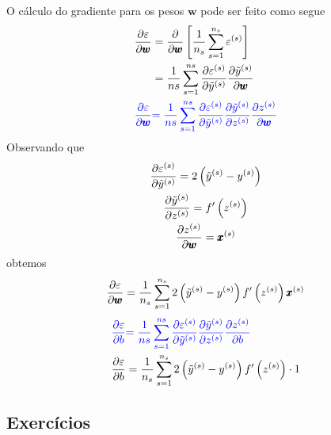 O cálculo do gradiente para os pesos $\pmb{w}$ pode ser feito como segue
\begin{align}
  \frac{\partial\varepsilon}{\partial \pmb{w}} &= \frac{\partial}{\partial\pmb{w}}\left[\frac{1}{n_s}\sum_{s=1}^{n_s}\varepsilon^{(s)}\right]\\
                                   &= \frac{1}{ns}\sum_{s=1}^{ns}\frac{\partial\varepsilon^{(s)}}{\partial\tilde{y}^{(s)}}\frac{\partial\tilde{y}^{(s)}}{\partial\pmb{w}}\\
  {\color{blue}\frac{\partial\varepsilon}{\partial \pmb{w}}} &{\color{blue}= \frac{1}{ns}\sum_{s=1}^{ns}\frac{\partial\varepsilon^{(s)}}{\partial\tilde{y}^{(s)}}\frac{\partial\tilde{y}^{(s)}}{\partial z^{(s)}}\frac{\partial z^{(s)}}{\partial\pmb{w}}}\\
\end{align}
Observando que
\begin{gather}
  \frac{\partial\varepsilon^{(s)}}{\partial\tilde{y}^{(s)}} = 2\left(\tilde{y}^{(s)} - y^{(s)}\right)\\
  \frac{\partial\tilde{y}^{(s)}}{\partial z^{(s)}} = f'\left(z^{(s)}\right)\\
  \frac{\partial z^{(s)}}{\partial\pmb{w}} = \pmb{x}^{(s)}
\end{gather}
obtemos
\begin{equation}
  \frac{\partial\varepsilon}{\partial \pmb{w}} = \frac{1}{n_s}\sum_{s=1}^{n_s}2\left(\tilde{y}^{(s)}-y^{(s)}\right)f'\left(z^{(s)}\right)\pmb{x}^{(s)}
\end{equation}
\begin{align}
  {\color{blue}\frac{\partial\varepsilon}{\partial b}} &{\color{blue}= \frac{1}{ns}\sum_{s=1}^{ns}\frac{\partial\varepsilon^{(s)}}{\partial\tilde{y}^{(s)}}\frac{\partial\tilde{y}^{(s)}}{\partial z^{(s)}}\frac{\partial z^{(s)}}{\partial b}}\\
  \frac{\partial\varepsilon}{\partial b} &= \frac{1}{n_s}\sum_{s=1}^{n_s}2\left(\tilde{y}^{(s)}-y^{(s)}\right)f'\left(z^{(s)}\right)\cdot 1
\end{align}

\emconstrucao

\subsection{Exercícios}

\emconstrucao

